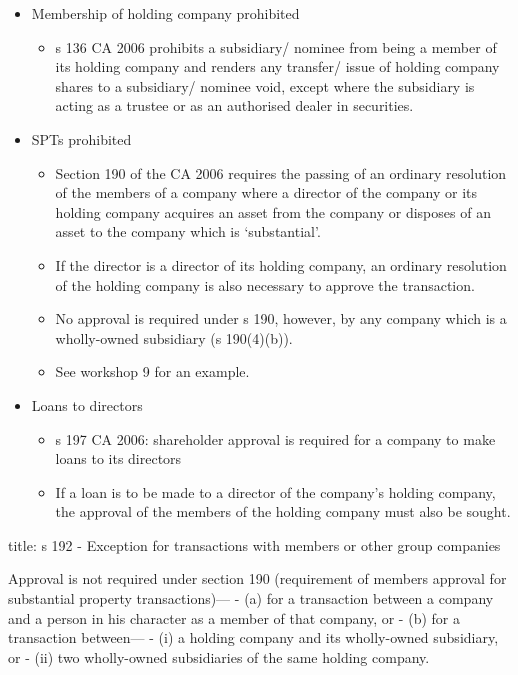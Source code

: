 \documentclass[
]{article}
\newenvironment{Shaded}{}{}
\newcommand{\NormalTok}[1]{#1}
\providecommand{\tightlist}{%
  \setlength{\itemsep}{0pt}\setlength{\parskip}{0pt}}
\begin{document}
\begin{itemize}
\tightlist
\item
  Membership of holding company prohibited

  \begin{itemize}
  \tightlist
  \item
    s 136 CA 2006 prohibits a subsidiary/ nominee from being a member of
    its holding company and renders any transfer/ issue of holding
    company shares to a subsidiary/ nominee void, except where the
    subsidiary is acting as a trustee or as an authorised dealer in
    securities.
  \end{itemize}
\item
  SPTs prohibited

  \begin{itemize}
  \tightlist
  \item
    Section 190 of the CA 2006 requires the passing of an ordinary
    resolution of the members of a company where a director of the
    company or its holding company acquires an asset from the company or
    disposes of an asset to the company which is `substantial'.
  \item
    If the director is a director of its holding company, an ordinary
    resolution of the holding company is also necessary to approve the
    transaction.
  \item
    No approval is required under s 190, however, by any company which
    is a wholly-owned subsidiary (s 190(4)(b)).
  \item
    See workshop 9 for an example.
  \end{itemize}
\item
  Loans to directors

  \begin{itemize}
  \tightlist
  \item
    s 197 CA 2006: shareholder approval is required for a company to
    make loans to its directors
  \item
    If a loan is to be made to a director of the company's holding
    company, the approval of the members of the holding company must
    also be sought.
  \end{itemize}
\end{itemize}

\begin{Shaded}
\begin{Highlighting}[]
\NormalTok{title: s 192 {-} Exception for transactions with members or other group companies}

\NormalTok{Approval is not required under section 190 (requirement of members\textquotesingle{} approval for substantial property transactions)—}
\NormalTok{{-} (a) for a transaction between a company and a person in his character as a member of that company, or}
\NormalTok{{-} (b) for a transaction between—}
\NormalTok{    {-} (i) a holding company and its wholly{-}owned subsidiary, or}
\NormalTok{    {-} (ii) two wholly{-}owned subsidiaries of the same holding company.}
\end{Highlighting}
\end{Shaded}
\end{document}

